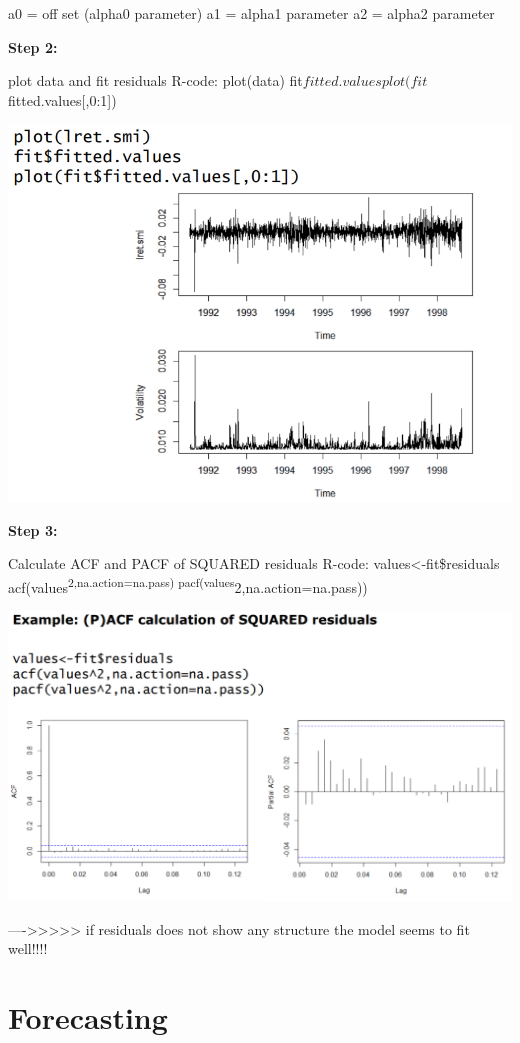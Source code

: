 \documentclass[
]{article}
\begin{document}
a0 = off set (alpha0 parameter) a1 = alpha1 parameter a2 = alpha2
parameter

\textbf{Step 2:}

plot data and fit residuals R-code: plot(data)
fit\(fitted.values plot(fit\)fitted.values{[},0:1{]})

\includegraphics[width=1\linewidth]{lo}

\textbf{Step 3:}

Calculate ACF and PACF of SQUARED residuals R-code:
values\textless-fit\$residuals
acf(values\textsuperscript{2,na.action=na.pass)
pacf(values}2,na.action=na.pass))

\includegraphics[width=1\linewidth]{val}

----\textgreater\textgreater\textgreater\textgreater\textgreater{} if
residuals does not show any structure the model seems to fit well!!!!

\hypertarget{forecasting}{%
\section{Forecasting}\label{forecasting}}
\end{document}
